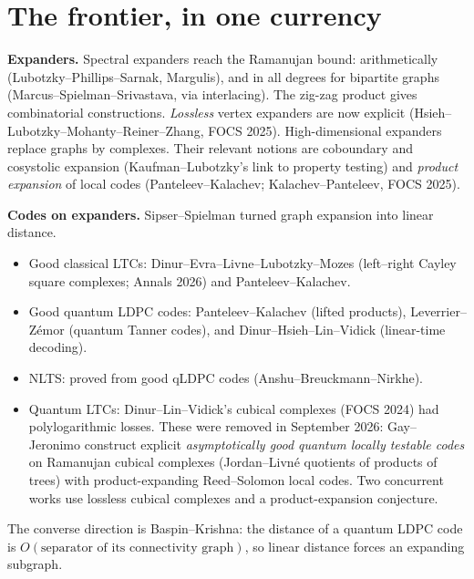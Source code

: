 \documentclass[11pt]{article}
\theoremstyle{definition}
\theoremstyle{remark}
\newcommand{\Z}{\mathbb Z}
\begin{document}
\begin{abstract}
\textbf{(4) Sturmian codes.} The window spectrum has at most three distinct eigenvalues, each in $\Z+\alpha\Z$. The following are equivalent: bounded-type slope; Bellissard--Julien bi-Lipschitz embeddability of the hull; uniformly conditioned local states.

\textbf{(5) Dichotomy.} Codes whose connectivity comes from amenable (``inner'') structure cannot reach linear distance (Baspin--Krishna plus hyperfiniteness). Codes whose orbit group is algebraic and expanding (CSS on left--right Cayley complexes) can. This is note~IV's ``inner never expands, outer rank two does'', in coding form. As a by-product, Ta-Shma's codes give explicit hierarchical quantum expanders of near-optimal size $\tilde\Theta(N/\varepsilon^2)$ on the tail algebra, improving note~I.
\end{abstract}

\tableofcontents

\section{The frontier, in one currency}

\textbf{Expanders.} Spectral expanders reach the Ramanujan bound: arithmetically (Lubotzky--Phillips--Sarnak, Margulis), and in all degrees for bipartite graphs (Marcus--Spielman--Srivastava, via interlacing). The zig-zag product gives combinatorial constructions. \emph{Lossless} vertex expanders are now explicit (Hsieh--Lubotzky--Mohanty--Reiner--Zhang, FOCS 2025). High-dimensional expanders replace graphs by complexes. Their relevant notions are coboundary and cosystolic expansion (Kaufman--Lubotzky's link to property testing) and \emph{product expansion} of local codes (Panteleev--Kalachev; Kalachev--Panteleev, FOCS 2025).

\textbf{Codes on expanders.} Sipser--Spielman turned graph expansion into linear distance.
\begin{itemize}
\item Good classical LTCs: Dinur--Evra--Livne--Lubotzky--Mozes (left--right Cayley square complexes; Annals 2026) and Panteleev--Kalachev.
\item Good quantum LDPC codes: Panteleev--Kalachev (lifted products), Leverrier--Z\'emor (quantum Tanner codes), and Dinur--Hsieh--Lin--Vidick (linear-time decoding).
\item NLTS: proved from good qLDPC codes (Anshu--Breuckmann--Nirkhe).
\item Quantum LTCs: Dinur--Lin--Vidick's cubical complexes (FOCS 2024) had polylogarithmic losses. These were removed in September 2026: Gay--Jeronimo construct explicit \emph{asymptotically good quantum locally testable codes} on Ramanujan cubical complexes (Jordan--Livn\'e quotients of products of trees) with product-expanding Reed--Solomon local codes. Two concurrent works use lossless cubical complexes and a product-expansion conjecture.
\end{itemize}
The converse direction is Baspin--Krishna: the distance of a quantum LDPC code is $O(\text{separator of its connectivity graph})$, so linear distance forces an expanding subgraph.
\end{document}
